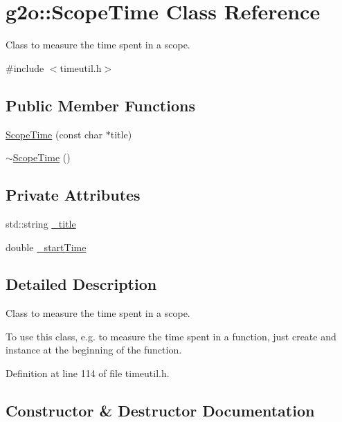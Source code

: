 \hypertarget{classg2o_1_1ScopeTime}{}\section{g2o\+:\+:Scope\+Time Class Reference}
\label{classg2o_1_1ScopeTime}


Class to measure the time spent in a scope.  




{\ttfamily \#include $<$timeutil.\+h$>$}

\subsection*{Public Member Functions}
\begin{DoxyCompactItemize}
\item 
\hyperlink{classg2o_1_1ScopeTime_ae9178f069977b767d21e314aab0c3bf2}{Scope\+Time} (const char $\ast$title)
\item 
\hyperlink{classg2o_1_1ScopeTime_afec269ec984e05313a28dda5eed02abc}{$\sim$\+Scope\+Time} ()
\end{DoxyCompactItemize}
\subsection*{Private Attributes}
\begin{DoxyCompactItemize}
\item 
std\+::string \hyperlink{classg2o_1_1ScopeTime_a6ee3cc8fa420b9963ad5198212c4a8b9}{\+\_\+title}
\item 
double \hyperlink{classg2o_1_1ScopeTime_ac9bcaa9a2dfbe09b98de1e7dd664433f}{\+\_\+start\+Time}
\end{DoxyCompactItemize}


\subsection{Detailed Description}
Class to measure the time spent in a scope. 

To use this class, e.\+g. to measure the time spent in a function, just create and instance at the beginning of the function. 

Definition at line 114 of file timeutil.\+h.



\subsection{Constructor \& Destructor Documentation}
